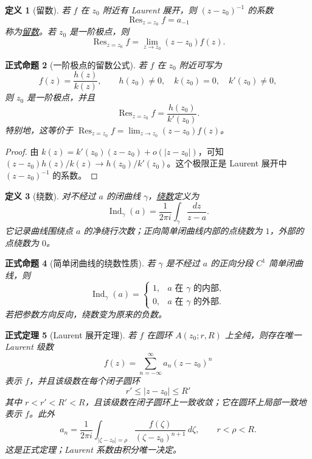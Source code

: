\documentclass[UTF8,fontset=none,a4paper,11pt]{ctexart}
\theoremstyle{foundation-definition}
\newtheorem{definition}{定义}[section]
\theoremstyle{foundation-theorem}
\newtheorem{theorem}[definition]{正式定理}
\theoremstyle{foundation-proposition}
\newtheorem{proposition}[definition]{正式命题}
\theoremstyle{foundation-example}
\theoremstyle{foundation-remark}
\theoremstyle{foundation-theorem}
\newcommand{\term}[2]{\hyperref[#1]{#2}}
\begin{document}
\begin{definition}[留数]\label{def:residue}
若 \(f\) 在 \(z_0\) 附近有 Laurent 展开，则 \((z-z_0)^{-1}\) 的系数
\[
\operatorname{Res}_{z=z_0}f=a_{-1}
\]
称为\term{def:residue}{留数}。若 \(z_0\) 是一阶极点，则
\[
\operatorname{Res}_{z=z_0}f
=\lim_{z\to z_0}(z-z_0)f(z).
\]
\end{definition}

\begin{proposition}[一阶极点的留数公式]\label{prop:simple-pole-residue}
若 \(f\) 在 \(z_0\) 附近可写为
\[
f(z)=\frac{h(z)}{k(z)},
\qquad h(z_0)\ne0,\quad k(z_0)=0,\quad k'(z_0)\ne0,
\]
则 \(z_0\) 是一阶极点，并且
\[
\operatorname{Res}_{z=z_0}f=\frac{h(z_0)}{k'(z_0)}.
\]
特别地，这等价于
\(\operatorname{Res}_{z=z_0}f=\lim_{z\to z_0}(z-z_0)f(z)\)。
\end{proposition}

\begin{proof}
由 \(k(z)=k'(z_0)(z-z_0)+o(|z-z_0|)\)，可知
\((z-z_0)h(z)/k(z)\to h(z_0)/k'(z_0)\)。这个极限正是 Laurent 展开中
\((z-z_0)^{-1}\) 的系数。
\end{proof}

\begin{definition}[绕数]\label{def:winding-number}
对不经过 \(a\) 的闭曲线 \(\gamma\)，\term{def:winding-number}{绕数}定义为
\[
\operatorname{Ind}_{\gamma}(a)=\frac{1}{2\pi i}
\int_{\gamma}\frac{dz}{z-a}.
\]
它记录曲线围绕点 \(a\) 的净绕行次数；正向简单闭曲线内部的点绕数为 \(1\)，外部的点绕数为 \(0\)。
\end{definition}

\begin{proposition}[简单闭曲线的绕数性质]\label{prop:winding-number-simple-curve}
若 \(\gamma\) 是不经过 \(a\) 的正向分段 \(C^1\) 简单闭曲线，则
\[
\operatorname{Ind}_{\gamma}(a)=
\begin{cases}
1,&a\text{ 在 }\gamma\text{ 的内部},\\
0,&a\text{ 在 }\gamma\text{ 的外部}.
\end{cases}
\]
若把参数方向反向，绕数变为原来的负数。
\end{proposition}

\begin{theorem}[Laurent 展开定理]
若 \(f\) 在圆环 \(A(z_0;r,R)\) 上全纯，则存在唯一 Laurent 级数
\[
f(z)=\sum_{n=-\infty}^{\infty}a_n(z-z_0)^n
\]
表示 \(f\)，并且该级数在每个闭子圆环
\[
r'\leq |z-z_0|\leq R'
\]
其中 \(r<r'<R'<R\)，且该级数在闭子圆环上一致收敛；它在圆环上局部一致地表示 \(f\)。此外
\[
a_n=\frac{1}{2\pi i}
\int_{|\zeta-z_0|=\rho}
\frac{f(\zeta)}{(\zeta-z_0)^{n+1}}\,d\zeta,
\qquad r<\rho<R.
\]
这是正式定理；Laurent 系数由积分唯一决定。
\end{theorem}
\end{document}
